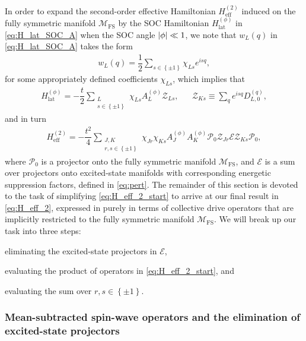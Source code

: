 \documentclass[nofootinbib,notitlepage,11pt]{revtex4-2}
\renewcommand{\t}{\text} %
\newcommand{\f}[2]{\dfrac{#1}{#2}} %
\newcommand{\p}[1]{\left(#1\right)} %
\renewcommand{\set}[1]{\left\{#1\right\}} %
\newcommand{\1}{\mathds{1}}
\newcommand{\E}{\mathcal{E}}
\newcommand{\M}{\mathcal{M}}
\renewcommand{\P}{\mathcal{P}}
\newcommand{\Z}{\mathcal{Z}}
\newcommand{\FS}{\text{FS}}
\begin{document}
In order to expand the second-order effective Hamiltonian
$H_{\t{eff}}^{(2)}$ induced on the fully symmetric manifold $\M_\FS$
by the SOC Hamiltonian $H_{\t{lat}}^{(\phi)}$ in
\eqref{eq:H_lat_SOC_A} when the SOC angle $\abs{\phi}\ll1$, we note
that $w_L\p{q}$ in \eqref{eq:H_lat_SOC_A} takes the form
\begin{align}
  w_L\p{q} = \f12 \sum_{s\in\set{\pm1}} \chi_{Ls} e^{isq},
  \label{eq:w_chi}
\end{align}
for some appropriately defined coefficients $\chi_{Ls}$, which implies
that
\begin{align}
  H_{\t{lat}}^{(\phi)}
  = -\f{t}{2} \sum_{\substack{L\\s\in\set{\pm1}}}
  \chi_{Ls} A_L^{(\phi)} \Z_{Ls},
  &&
  \Z_{Ks} \equiv \sum_q e^{isq} D_{L,0}^{(q)},
\end{align}
and in turn
\begin{align}
  H_{\t{eff}}^{(2)}
  = -\f{t^2}{4} \sum_{\substack{J,K\\r,s\in\set{\pm1}}}
  \chi_{Jr} \chi_{Ks} A_J^{(\phi)} A_K^{(\phi)}
  \P_0 \Z_{Jr} \E \Z_{Ks} \P_0,
  \label{eq:H_eff_2_start}
\end{align}
where $\P_0$ is a projector onto the fully symmetric manifold
$\M_\FS$, and $\E$ is a sum over projectors onto excited-state
manifolds with corresponding energetic suppression factors, defined in
\eqref{eq:pert}.  The remainder of this section is devoted to the task
of simplifying \eqref{eq:H_eff_2_start} to arrive at our final result
in \eqref{eq:H_eff_2}, expressed in purely in terms of collective
drive operators that are implicitly restricted to the fully symmetric
manifold $\M_\FS$.  We will break up our task into three steps:
\begin{enumerate*}
\item eliminating the excited-state projectors in $\E$,
\item evaluating the product of operators in \eqref{eq:H_eff_2_start},
  and
\item evaluating the sum over $r,s\in\set{\pm1}$.
\end{enumerate*}


\subsubsection{Mean-subtracted spin-wave operators and the elimination
  of excited-state projectors}
\end{document}
